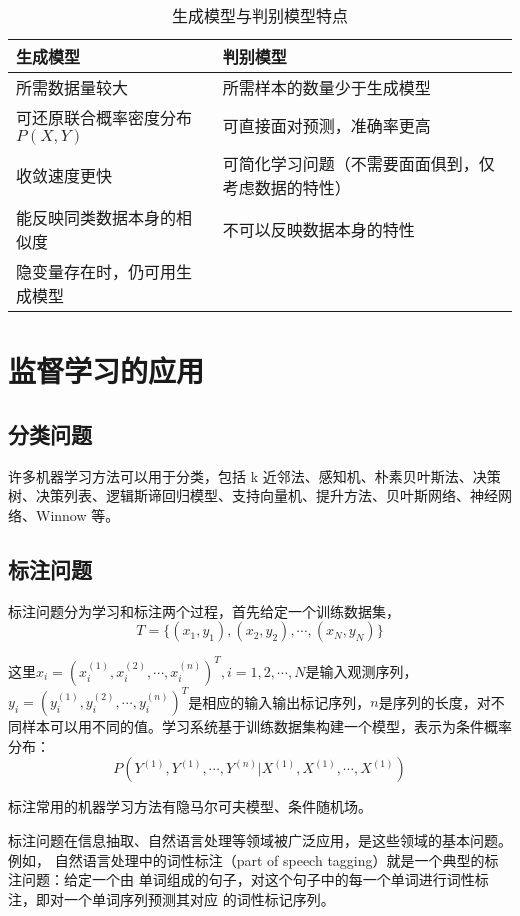\begin{table}
    \centering
    \caption{生成模型与判别模型特点}
    \begin{tabular}{ll}
        \hline
        生成模型                  & 判别模型                      \\
        \hline
        所需数据量较大               & 所需样本的数量少于生成模型             \\
        可还原联合概率密度分布 $P(X, Y)$ & 可直接面对预测，准确率更高             \\
        收敛速度更快                & 可简化学习问题（不需要面面俱到，仅考虑数据的特性） \\
        能反映同类数据本身的相似度         & 不可以反映数据本身的特性              \\
        隐变量存在时，仍可用生成模型        &                           \\
        \hline
    \end{tabular}
\end{table}
\section{监督学习的应用}
\subsection{分类问题}
许多机器学习方法可以用于分类，包括 k 近邻法、感知机、朴素贝叶斯法、决策树、决策列表、逻辑斯谛回归模型、支持向量机、提升方法、贝叶斯网络、神经网络、Winnow 等。
\subsection{标注问题}
标注问题分为学习和标注两个过程，首先给定一个训练数据集，
\begin{equation*}
    T = \{(x_1, y_1),(x_2, y_2),\cdots,(x_N,y_N)\}
\end{equation*}

这里$x_i=(x_i^{(1)},x_i^{(2)},\cdots,x_i^{(n)})^T, i=1,2,\cdots, N$是输入观测序列，$y_i=(y_i^{(1)},y_i^{(2)},\cdots,y_i^{(n)})^T$是相应的输入输出标记序列，$n$是序列的长度，对不同样本可以用不同的值。学习系统基于训练数据集构建一个模型，表示为条件概率分布：
\begin{equation}
    P(Y^{(1)},Y^{(1)},\cdots, Y^{(n)}|X^{(1)},X^{(1)},\cdots,X^{(1)})
\end{equation}

标注常用的机器学习方法有隐马尔可夫模型、条件随机场。

标注问题在信息抽取、自然语言处理等领域被广泛应用，是这些领域的基本问题。例如，
自然语言处理中的词性标注（part of speech tagging）就是一个典型的标注问题：给定一个由
单词组成的句子，对这个句子中的每一个单词进行词性标注，即对一个单词序列预测其对应
的词性标记序列。

